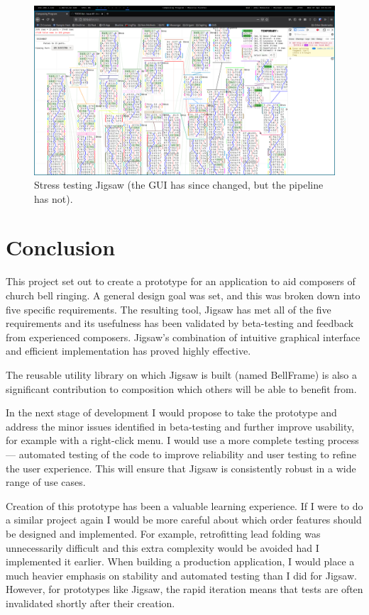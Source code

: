 \documentclass[12pt]{article}
\begin{document}
\begin{figure}
    \centering
    \includegraphics[width=\textwidth]{stress-test}
    \caption{Stress testing Jigsaw (the GUI has since changed, but the pipeline has
    not).}\label{fig:stress-test}
\end{figure}



\pagebreak

\section{Conclusion}

This project set out to create a prototype for an application to aid composers of church bell
ringing.  A general design goal was set, and this was broken down into five specific requirements.
The resulting tool, Jigsaw has met all of the five requirements and its usefulness has been
validated by beta-testing and feedback from experienced composers. Jigsaw's combination of intuitive
graphical interface and efficient implementation has proved highly effective.

The reusable utility library on which Jigsaw is built (named BellFrame) is also a significant
contribution to composition which others will be able to benefit from.

In the next stage of development I would propose to take the prototype and address the minor issues
identified in beta-testing and further improve usability, for example with a right-click menu. I
would use a more complete testing process --- automated testing of the code to improve reliability
and user testing to refine the user experience.  This will ensure that Jigsaw is consistently
robust in a wide range of use cases.

Creation of this prototype has been a valuable learning experience.  If I were to do a similar
project again I would be more careful about which order features should be designed and implemented.
For example, retrofitting lead folding was unnecessarily difficult and this extra complexity would
be avoided had I implemented it earlier.  When building a production application, I would place a
much heavier emphasis on stability and automated testing than I did for Jigsaw.  However, for
prototypes like Jigsaw, the rapid iteration means that tests are often invalidated shortly after
their creation.
\end{document}

